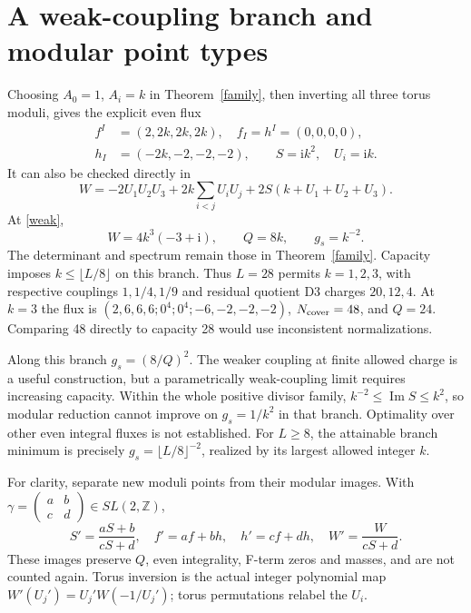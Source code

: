 \documentclass[11pt]{article}
\newcommand{\ii}{\mathrm{i}}
\newcommand{\Z}{\mathbb Z}
\newcommand{\Imn}{\operatorname{Im}}
\begin{document}
\section{A weak-coupling branch and modular point types}
Choosing $A_0=1$, $A_i=k$ in Theorem~\ref{family}, then inverting all three
torus moduli, gives the explicit even flux
\begin{equation}
\begin{split}
 f^I&=(2,2k,2k,2k),\quad f_I=h^I=(0,0,0,0),\\
 h_I&=(-2k,-2,-2,-2),\qquad S=\ii k^2,\quad U_i=\ii k.
\end{split}
\label{weak}
\end{equation}
It can also be checked directly in
\begin{equation}
W=-2U_1U_2U_3+2k\sum_{i<j}U_iU_j+2S(k+U_1+U_2+U_3).
\end{equation}
At \eqref{weak},
\begin{equation}
W=4k^3(-3+\ii),\qquad Q=8k,\qquad g_s=k^{-2}.
\end{equation}
The determinant and spectrum remain those in Theorem~\ref{family}.
Capacity imposes $k\le\lfloor L/8\rfloor$ on this branch. Thus $L=28$
permits $k=1,2,3$, with respective couplings $1,1/4,1/9$ and residual
quotient D3 charges $20,12,4$. At $k=3$ the flux is
$(2,6,6,6;0^4;0^4;-6,-2,-2,-2)$, $N_{\rm cover}=48$, and $Q=24$.
Comparing 48 directly to capacity 28 would use inconsistent normalizations.

Along this branch $g_s=(8/Q)^2$. The weaker coupling at finite allowed
charge is a useful construction, but a parametrically weak-coupling limit
requires increasing capacity. Within the whole positive divisor family,
$k^{-2}\le\Imn S\le k^2$, so modular reduction cannot improve on
$g_s=1/k^2$ in that branch. Optimality over other even integral fluxes is
not established.
For $L\ge8$, the attainable branch minimum is precisely
$g_s=\lfloor L/8\rfloor^{-2}$, realized by its largest allowed integer $k$.

For clarity, separate new moduli points from their modular images. With
$\gamma=\left(\begin{smallmatrix}a&b\\c&d\end{smallmatrix}\right)\in
SL(2,\Z)$,
\begin{equation}
S'=\frac{aS+b}{cS+d},\quad f'=af+bh,\quad h'=cf+dh,\quad
W'=\frac{W}{cS+d}.
\end{equation}
These images preserve $Q$, even integrality, F-term zeros and masses, and
are not counted again. Torus inversion is the actual integer polynomial
map $W'(U_j')=U_j'W(-1/U_j')$; torus permutations relabel the $U_i$.
\end{document}
